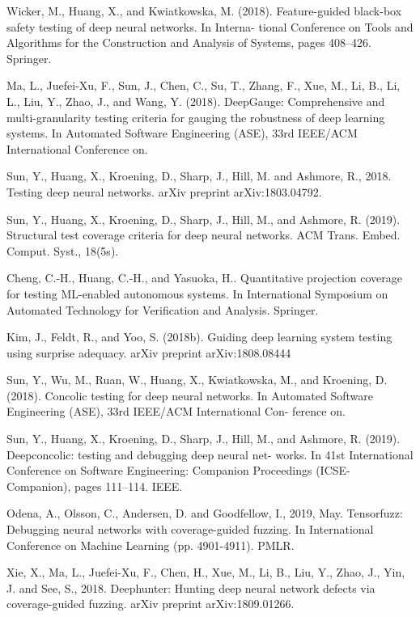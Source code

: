 \begin{singlespace}
\begin{thebibliography}{}
 Wicker, M., Huang, X., and Kwiatkowska, M. (2018). Feature-guided black-box safety testing of deep neural networks. In Interna- tional Conference on Tools and Algorithms for the Construction and Analysis of Systems, pages 408–426. Springer.

 Ma, L., Juefei-Xu, F., Sun, J., Chen, C., Su, T., Zhang, F., Xue, M., Li, B., Li, L., Liu, Y., Zhao, J., and Wang, Y. (2018). DeepGauge: Comprehensive and multi-granularity testing criteria for gauging the robustness of deep learning systems. In Automated Software Engineering (ASE), 33rd IEEE/ACM International Conference on.

    
Sun, Y., Huang, X., Kroening, D., Sharp, J., Hill, M. and Ashmore, R., 2018. Testing deep neural networks. arXiv preprint arXiv:1803.04792.

 Sun, Y., Huang, X., Kroening, D., Sharp, J., Hill, M., and Ashmore, R. (2019). Structural test coverage criteria for deep neural networks. ACM Trans. Embed. Comput. Syst., 18(5s).

Cheng, C.-H., Huang, C.-H., and Yasuoka, H.. Quantitative projection coverage for testing ML-enabled autonomous systems. In International Symposium on Automated Technology for Verification and Analysis. Springer.

 Kim, J., Feldt, R., and Yoo, S. (2018b). Guiding deep learning system testing using surprise adequacy. arXiv preprint arXiv:1808.08444

 Sun, Y., Wu, M., Ruan, W., Huang, X., Kwiatkowska, M., and Kroening, D. (2018). Concolic testing for deep neural networks. In Automated Software Engineering (ASE), 33rd IEEE/ACM International Con- ference on.

 Sun, Y., Huang, X., Kroening, D., Sharp, J., Hill, M., and Ashmore, R. (2019). Deepconcolic: testing and debugging deep neural net- works. In 41st International Conference on Software Engineering: Companion Proceedings (ICSE-Companion), pages 111–114. IEEE.

 Odena, A., Olsson, C., Andersen, D. and Goodfellow, I., 2019, May. Tensorfuzz: Debugging neural networks with coverage-guided fuzzing. In International Conference on Machine Learning (pp. 4901-4911). PMLR.

Xie, X., Ma, L., Juefei-Xu, F., Chen, H., Xue, M., Li, B., Liu, Y., Zhao, J., Yin, J. and See, S., 2018. Deephunter: Hunting deep neural network defects via coverage-guided fuzzing. arXiv preprint arXiv:1809.01266.


\end{thebibliography}
\end{singlespace}

